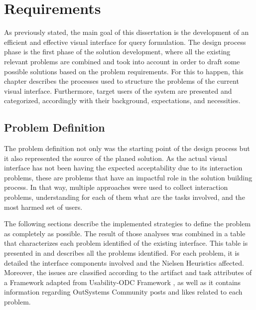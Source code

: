 \chapter{Requirements}
\label{cha:requirements}

As previously stated, the main goal of this dissertation is the development of an efficient and effective visual interface for query formulation. The design process phase is the first phase of the solution development, where all the existing relevant problems are combined and took into account in order to draft some possible solutions based on the problem requirements. For this to happen, this chapter describes the processes used to structure the problems of the current visual interface. Furthermore, target users of the system are presented and categorized, accordingly with their background, expectations, and necessities.

\section{Problem Definition}
\label{sec:problem_definition}

The problem definition not only was the starting point of the design process but it also represented the source of the planed solution. As the actual visual interface has not been having the expected acceptability due to its interaction problems, these are problems that have an impactful role in the solution building process. In that way, multiple approaches were used to collect interaction problems, understanding for each of them what are the tasks involved, and the most harmed set of users.

The following sections describe the implemented strategies to define the problem as completely as possible. The result of those analyses was combined in a table that characterizes each problem identified of the existing interface. This table is presented in  and describes all the problems identified. For each problem, it is detailed the interface components involved and the Nielsen Heuristics \cite{nielsen_heuristics} affected. Moreover, the issues are classified according to the artifact and task attributes of a Framework adapted from Usability-ODC Framework \cite{in_process_usability_problem_classification_analysis_improvement}, as well as it contains information regarding OutSystems Community\cite{outsystems_community} posts and likes related to each problem.

